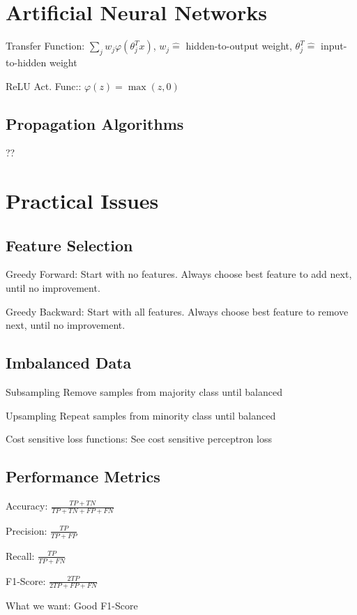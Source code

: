 \documentclass[a4paper, 11pt, landscape]{article}
\begin{document}
\begin{multicols*}{3}
		
		\section{Artificial Neural Networks}
		\begin{compactdesc}
			\item[Transfer Function:] $\sum_{j}^{}w_j\varphi(\theta_j^Tx)$, $w_j \hat{=}$ hidden-to-output weight, $\theta_j^T \hat{=}$ input-to-hidden weight
			\item[ReLU Act. Func::] $\varphi(z) = \max(z,0)$
		\end{compactdesc}
		\subsection{Propagation Algorithms}
		??
		\section{Practical Issues}
		\subsection{Feature Selection}
		\begin{compactdesc}
			\item[Greedy Forward:] Start with no features. Always choose best feature to add next, until no improvement.
			\item[Greedy Backward:] Start with all features. Always choose best feature to remove next, until no improvement.
		\end{compactdesc}
		\subsection{Imbalanced Data}
		\begin{compactdesc}
			\item[Subsampling] Remove samples from majority class until balanced
			\item[Upsampling] Repeat samples from minority class until balanced
			\item[Cost sensitive loss functions:] See cost sensitive perceptron loss
		\end{compactdesc}
		\subsection{Performance Metrics}
		\begin{compactdesc}
			\item[Accuracy:] $\frac{TP + TN}{TP + TN + FP + FN}$
			\item[Precision:] $\frac{TP}{TP + FP}$
			\item[Recall:] $\frac{TP}{TP + FN}$
			\item[F1-Score:] $\frac{2TP}{2TP + FP + FN}$
			\item[What we want:] Good F1-Score
		\end{compactdesc}
		

\end{multicols*}
\end{document}
